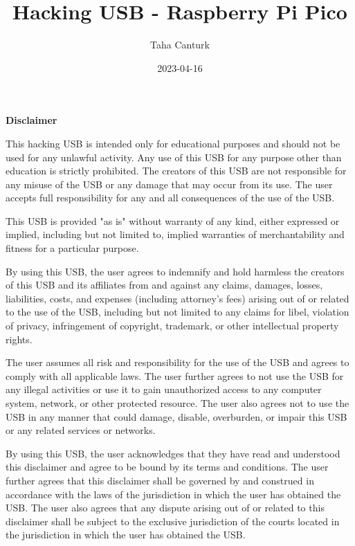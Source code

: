 \documentclass[a4paper,12pt]{article}
\title{Hacking USB - Raspberry Pi Pico}
\author{Taha Canturk}
\date{2023-04-16}
\begin{document}
\maketitle

\newpage

\begin{titlepage}
\end{titlepage}

\textbf{Disclaimer}

\vspace{0.2in} %

This hacking USB is intended only for educational purposes and should not be used for any unlawful activity. Any use of this USB for any purpose other than education is strictly prohibited. The creators of this USB are not responsible for any misuse of the USB or any damage that may occur from its use. The user accepts full responsibility for any and all consequences of the use of the USB.

This USB is provided "as is" without warranty of any kind, either expressed or implied, including but not limited to, implied warranties of merchantability and fitness for a particular purpose.

By using this USB, the user agrees to indemnify and hold harmless the creators of this USB and its affiliates from and against any claims, damages, losses, liabilities, costs, and expenses (including attorney's fees) arising out of or related to the use of the USB, including but not limited to any claims for libel, violation of privacy, infringement of copyright, trademark, or other intellectual property rights.

The user assumes all risk and responsibility for the use of the USB and agrees to comply with all applicable laws. The user further agrees to not use the USB for any illegal activities or use it to gain unauthorized access to any computer system, network, or other protected resource. The user also agrees not to use the USB in any manner that could damage, disable, overburden, or impair this USB or any related services or networks.

By using this USB, the user acknowledges that they have read and understood this disclaimer and agree to be bound by its terms and conditions. The user further agrees that this disclaimer shall be governed by and construed in accordance with the laws of the jurisdiction in which the user has obtained the USB. The user also agrees that any dispute arising out of or related to this disclaimer shall be subject to the exclusive jurisdiction of the courts located in the jurisdiction in which the user has obtained the USB.
\end{document}
